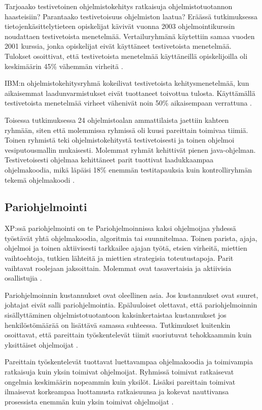 \documentclass[finnish]{tktltiki2}
\theoremstyle{definition}
\theoremstyle{remark}
\begin{document}
Tarjoaako testivetoinen ohjelmistokehitys ratkaisuja ohjelmistotuotannon haasteisiin? Parantaako testivetoisuus ohjelmiston laatua? Eräässä tutkimuksessa tietojenkäsittelytieteen opiskelijat kävivät vuonna 2003 ohjelmointikurssin noudattaen testivetoista menetelmää. Vertailuryhmänä käytettiin samaa vuoden 2001 kurssia, jonka opiskelijat eivät käyttäneet testivetoista menetelmää. Tulokset osoittivat, että testivetoista menetelmää käyttäneillä opiskelijoilla oli keskimäärin 45\% vähemmän virheitä \cite{EDW03}.

IBM:n ohjelmistokehitysryhmä kokeilivat testivetoista kehitysmenetelmää, kun aikaisemmat laadunvarmistukset eivät tuottaneet toivottua tulosta. Käyttämällä testivetoista menetelmää virheet vähenivät noin 50\% aikaisempaan verrattuna \cite{MAW03}.

Toisessa tutkimuksessa 24 ohjelmistoalan ammattilaista jaettiin kahteen ryhmään, siten että molemmissa ryhmissä oli kuusi pareittain toimivaa tiimiä. Toinen ryhmistä teki ohjelmistokehitystä testivetoisesti ja toinen ohjelmoi vesiputousmallin mukaisesti. Molemmat ryhmät kehittivät pienen java-ohjelman. Testivetoisesti ohjelmaa kehittäneet parit tuottivat laadukkaampaa ohjelmakoodia, mikä läpäisi 18\% enemmän testitapauksia kuin kontrolliryhmän tekemä ohjelmakoodi \cite{GEW03}. 



\subsection{Pariohjelmointi}
XP:ssä pariohjelmointi on te
Pariohjelmoinnissa kaksi ohjelmoijaa yhdessä työstävät yhtä ohjelmakoodia, algoritmia tai suunnitelmaa. Toinen parista, ajaja, ohjelmoi ja toinen aktiivisesti tarkkailee ajajan työtä, etsien virheitä, miettien vaihtoehtoja, tutkien lähteitä ja miettien strategisia toteutustapoja. Parit vaihtavat roolejaan jaksoittain. Molemmat ovat tasavertaisia ja aktiivisia osallistujia \cite{WIL00}.

Pariohjelmoinnin kustannukset ovat oleellinen asia. Jos kustannukset ovat suuret, johtajat eivät salli pariohjelmointia. Epäluuloiset olettavat, että pariohjelmoinnin sisällyttäminen ohjelmistotuotantoon kaksinkertaistaa kustannukset jos henkilöstömäärää on lisättävä samassa suhteessa. Tutkimukset kuitenkin osoittavat, että pareittain työskentelevät tiimit suoriutuvat tehokkaammin kuin yksittäiset ohjelmoijat \cite{NOS98} \cite{WIL00}.

Pareittain työskentelevät tuottavat luettavampaa ohjelmakoodia ja toimivampia ratkaisuja kuin yksin toimivat ohjelmoijat. Ryhmissä toimivat ratkaisevat ongelmia keskimäärin nopeammin kuin yksilöt. Lisäksi pareittain toimivat ilmaisevat korkeampaa luottamusta ratkaisuunsa ja kokevat nauttivansa prosessista enemmän kuin yksin toimivat ohjelmoijat \cite{NOS98}.   
\end{document}
